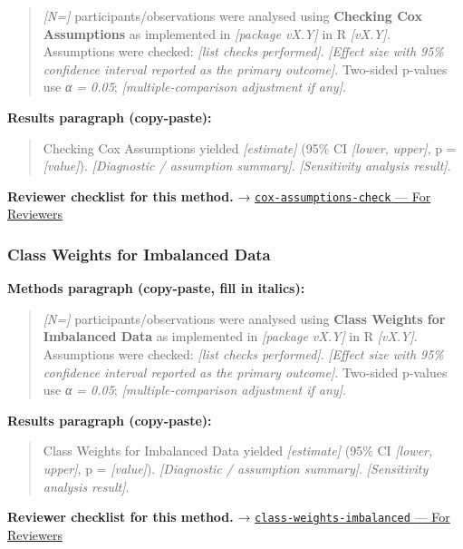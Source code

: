 \documentclass[
]{article}
\begin{document}
\begin{quote}
\emph{{[}N={]}} participants/observations were analysed using
\textbf{Checking Cox Assumptions} as implemented in \emph{{[}package
vX.Y{]}} in R \emph{{[}vX.Y{]}}. Assumptions were checked: \emph{{[}list
checks performed{]}}. \emph{{[}Effect size with 95\% confidence interval
reported as the primary outcome{]}}. Two-sided p-values use \emph{α =
0.05}; \emph{{[}multiple-comparison adjustment if any{]}}.
\end{quote}

\textbf{Results paragraph (copy-paste):}

\begin{quote}
Checking Cox Assumptions yielded \emph{{[}estimate{]}} (95\% CI
\emph{{[}lower, upper{]}}, p = \emph{{[}value{]}}). \emph{{[}Diagnostic
/ assumption summary{]}}. \emph{{[}Sensitivity analysis result{]}}.
\end{quote}

\textbf{Reviewer checklist for this method.} →
\href{../chapters/11-survival/cox-assumptions-check.Rmd\#for-reviewers}{\texttt{cox-assumptions-check}
--- For Reviewers}

\subsubsection{Class Weights for Imbalanced
Data}\label{class-weights-for-imbalanced-data}

\textbf{Methods paragraph (copy-paste, fill in italics):}

\begin{quote}
\emph{{[}N={]}} participants/observations were analysed using
\textbf{Class Weights for Imbalanced Data} as implemented in
\emph{{[}package vX.Y{]}} in R \emph{{[}vX.Y{]}}. Assumptions were
checked: \emph{{[}list checks performed{]}}. \emph{{[}Effect size with
95\% confidence interval reported as the primary outcome{]}}. Two-sided
p-values use \emph{α = 0.05}; \emph{{[}multiple-comparison adjustment if
any{]}}.
\end{quote}

\textbf{Results paragraph (copy-paste):}

\begin{quote}
Class Weights for Imbalanced Data yielded \emph{{[}estimate{]}} (95\% CI
\emph{{[}lower, upper{]}}, p = \emph{{[}value{]}}). \emph{{[}Diagnostic
/ assumption summary{]}}. \emph{{[}Sensitivity analysis result{]}}.
\end{quote}

\textbf{Reviewer checklist for this method.} →
\href{../chapters/13-ml/class-weights-imbalanced.Rmd\#for-reviewers}{\texttt{class-weights-imbalanced}
--- For Reviewers}
\end{document}
